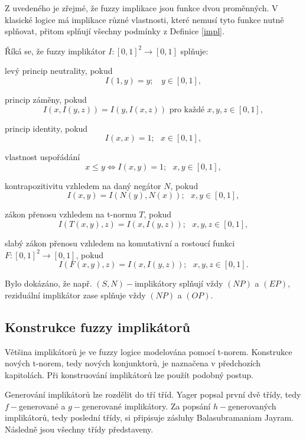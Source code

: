 Z uveden\'eho je z\v rejm\'e, \v ze fuzzy implikace jsou funkce dvou prom\v enn\'ych.
V klasick\'e logice m\'a implikace r\r uzn\'e vlastnosti, kter\'e nemus\'i tyto funkce nutn\v e spl\v novat, p\v ritom spl\v nuj\'i v\v sechny podm\'inky z Definice \ref{impl}.

\begin{definition}
\cite{Springer}
Říká se, že fuzzy implik\'ator $I:[0,1]^2 \rightarrow [0,1]$ spl\v nuje:
\begin{enumerate}
\item[(NP)] levý princip neutrality, pokud
$$I(1,y)=y; ~~~~y \in [0,1],$$
\item[(EP)] princip z\'aměny, pokud
$$I(x,I(y,z))=I(y,I(x,z)) \mbox{  pro ka\v zd\'e   } x,y,z \in [0,1],$$
\item[(IP)] princip identity, pokud
$$I(x,x) = 1; ~~~ x \in [0,1], $$
\item[(OP)] vlastnost uspořádání
$$x \leq y \iff I(x,y) =1; ~~~ x,y \in [0,1],$$
\item[(CP)] kontrapozitivitu vzhledem na dan\'y neg\'ator $N$, pokud
$$ I(x,y)=I(N(y),N(x)); ~~~ x,y \in [0,1],$$
 {\item[(LI)] z\'akon přenosu  vzhledem na  t-normu $T$, pokud
$$I(T(x, y), z) = I(x, I(y, z)); ~~~ x,y,z \in  [0, 1],$$
\item[(WLI)]  slab\'y z\'akon přenosu vzhledem na komutativní a
rostoucí funkci $F:
[0,1]^2 \to [0, 1]$, pokud
$$I(F(x, y), z) = I(x, I(y, z)); ~~~  x,y,z \in  [0, 1].$$}
\end{enumerate}
\end{definition}

\begin{remark}
    Bylo dok\'az\'ano, \v ze nap\v r. $(S,N)-$implikátory spl\v nují v\v zdy $(NP)$ a $(EP)$, reziduální implikátor zase spl\v nuje v\v zdy $(NP)$ a $(OP).$
\end{remark}

\subsection{Konstrukce fuzzy implikátor\r u}

Většina implikátor\r u je ve fuzzy logice modelována pomocí t-norem. Konstrukce nových t-norem, tedy nových konjunktor\r u, je naznačena v předchozích kapitolách. Při konstruování implikátor\r u lze použít podobný postup.

Generování implikátor\r u lze rozdělit do tří tříd. Yager popsal první dvě třídy, tedy $f-$generované a $g-$generované implikátory. Za popsání  $h-$generovaných implikátor\r u, tedy poslední třídy, si připisuje zásluhy Balasubramaniam Jayram. Následně jsou všechny třídy představeny.

